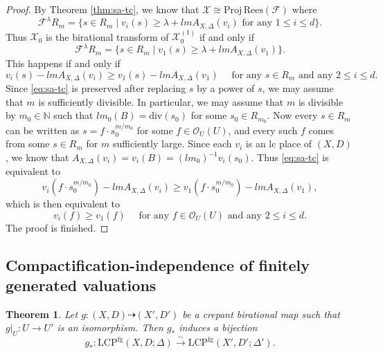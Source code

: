 \documentclass[reqno, 12pt]{amsart}
\newtheorem{thm}[prop]{Theorem}
\theoremstyle{definition}
\newcommand{\bN}{\mathbb{N}}
\newcommand{\cX}{\mathcal{X}}
\newcommand{\cO}{\mathcal{O}}
\newcommand{\cF}{\mathcal{F}}
\newcommand{\Supp}{\mathrm{Supp}}
\newcommand{\Proj}{\mathrm{Proj}}
\newcommand{\LCP}{\mathrm{LCP}}
\newcommand{\rdiv}{\mathrm{div}}
\newcommand{\Rees}{\mathrm{Rees}}
\numberwithin{equation}{section}
\begin{document}
\begin{proof}
By Theorem \ref{thm:sa-tc}, we know that $\cX\cong \Proj \,\Rees(\cF)$ where 
\[
\cF^{\lambda} R_m = \{s\in R_m \mid v_i(s) \geq \lambda + lm A_{X,\Delta}(v_i)\textrm{ for any }1\leq i \leq d\}.
\]
Thus $\cX_0$ is the birational transform of $\cX_0^{(1)}$ if and only if 
\[
\cF^{\lambda} R_m =  \{s\in R_m \mid v_1(s) \geq \lambda + lm A_{X,\Delta}(v_1)\}.
\]
This happens if and only if 
\begin{equation}\label{eq:sa-tc}
    v_i(s)-lm A_{X,\Delta}(v_i) \geq v_1(s) - lm A_{X,\Delta}(v_1)\quad \textrm{ for any }s\in R_m\textrm{ and any }2\leq i\leq d.
\end{equation}
Since \eqref{eq:sa-tc} is preserved after replacing $s$ by a power of $s$, we may assume that $m$ is sufficiently divisible. In particular, we may assume that $m$ is divisible by $m_0\in \bN$ such that $lm_0(B) = \rdiv(s_0)$ for some $s_0\in R_{m_0}$. Now every $s\in R_m$ can be written as $s = f\cdot s_0^{m/m_0}$ for some $f\in \cO_U(U)$, and every such $f$ comes from some $s\in R_m$ for $m$ sufficiently large. Since each $v_i$ is an lc place of $(X,D)$, we know that $A_{X,\Delta}(v_i) = v_i (B) = (lm_0)^{-1} v_i(s_0)$. Thus \eqref{eq:sa-tc} is equivalent to 
\[
v_i(f\cdot s_0^{m/m_0}) - lm A_{X,\Delta}(v_i) \geq v_1 (f\cdot s_0^{m/m_0}) - lm A_{X,\Delta} (v_1),
\]
which is then equivalent to 
\[
v_i(f) \geq v_1 (f) \quad\textrm{ for any }f\in \cO_U(U)\textrm{ and any }2\leq i \leq d.
\]
The proof is finished.
\end{proof}

\subsection{Compactification-independence of finitely generated valuations}


\begin{thm}\label{thm:fg}
Let $g: (X,D) \dashrightarrow (X',D')$ be a crepant birational map such that $g|_U: U\to U'$ is an isomorphism. Then $g_*$ induces a bijection
\[
g_*:\LCP^{\mathrm{fg}}(X,D;\Delta)
\xrightarrow{\sim}
\LCP^{\mathrm{fg}}(X',D';\Delta').
\]
\end{thm}
\end{document}
